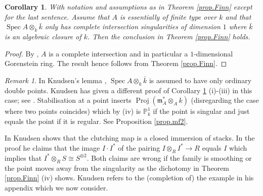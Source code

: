 \documentclass[a4paper,10pt]{amsart}
\theoremstyle{plain}
\newtheorem{cor}[xx]{Corollary}%
\theoremstyle{definition}
\theoremstyle{remark}
\newtheorem{rem}[xx]{Remark}
\numberwithin{equation}{xx}
\DeclareMathOperator{\Proj}{Proj}
\DeclareMathOperator{\Spec}{Spec}
\newcommand{\ra}{\rightarrow}
\newcommand{\ot}{{\otimes}}
\newcommand{\BB}[1]{\mathbb{{#1}}}
\newcommand{\fr}[1]{\mathfrak{{#1}}}
\begin{document}
\begin{cor}\label{cor.Finn}
With notation and assumptions as in \textup{Theorem \ref{prop.Finn}} except for the last sentence\textup{.} Assume that \(A\) is essentially of finite type over \(k\) and that \(\Spec A\ot_{k}\bar{k}\) only has complete intersection singularities of dimension \(1\) where \(\bar{k}\) is an algebraic closure of \(k\)\textup{.} 
Then the conclusion in \textup{Theorem \ref{prop.Finn}} holds\textup{.}
\end{cor}
\begin{proof}
By \cite[19.3.4]{EGAIV4}, \(A\) is a complete intersection and in particular a \(1\)-dimensional Gorenstein ring. The result hence follows from Theorem \ref{prop.Finn}.
\end{proof}
\begin{rem}\label{rem.Finn2}
In Knudsen's lemma \cite[2.2]{knu:83a}, \(\Spec A\ot_{k}\bar{k}\) is assumed to have only ordinary double points. Knudsen has given a different proof of Corollary \ref{cor.Finn} (i)-(iii) in this case; see \cite{knu:12}. Stabilisation at a point inserts \(\Proj(\fr{m}_{A}^{*}\ot_{A}k)\) (disregarding the case where two points coincides) which by (iv) is \(\BB{P}^{1}_{k}\) if the point is singular and just equals the point if it is regular. See Proposition \ref{prop.mf2}. 

In \cite[3.7]{knu:83a} Knudsen shows that the clutching map is a closed immersion of stacks. In the proof he claims that the image \(I{\cdot}I^{*}\) of the pairing \(I\ot_{R}I^{*}\ra R\) equals \(I\) which implies that \(I^{*}\ot_{R}S\cong S^{\oplus2}\). Both claims are wrong if the family is smoothing or the point moves away from the singularity as the dichotomy in Theorem \ref{prop.Finn} (iv) shows. Knudsen refers to the (completion of) the example in his appendix which we now consider.
\end{rem}
\end{document}
